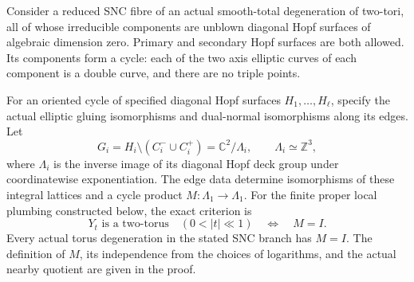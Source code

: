 \begin{proposition}\label{cdp:st:C.2.UN.46}

Consider a reduced SNC fibre of an actual smooth-total
degeneration of two-tori, all of whose irreducible components
are unblown diagonal Hopf surfaces of algebraic dimension zero.
Primary and secondary Hopf surfaces are both allowed.
Its components form a cycle: each of the two axis elliptic
curves of each component is a double curve, and there are
no triple points.

For an oriented cycle of specified diagonal Hopf surfaces
$H_1,\ldots,H_\ell$, specify the actual elliptic gluing
isomorphisms and dual-normal isomorphisms along its edges.
Let
\[
 G_i=H_i\setminus(C_i^-\cup C_i^+)
       =\mathbb C^2/\Lambda_i,\qquad \Lambda_i\simeq\mathbb Z^3,
\tag{C.HC.1}\label{cdp:eq:C.HC.1}
\]
where $\Lambda_i$ is the inverse image of its diagonal
Hopf deck group under coordinatewise exponentiation.
The edge data determine isomorphisms of these integral
lattices and a cycle product $M:\Lambda_1\to\Lambda_1$.
For the finite proper local plumbing constructed below,
the exact criterion is
\[
 \text{$Y_t$ is a two-torus}\quad(0<|t|\ll1)
       \quad\Longleftrightarrow\quad M=I.
\tag{C.HC.2}\label{cdp:eq:C.HC.2}
\]
Every actual torus degeneration in the stated SNC branch
has $M=I$. The definition of $M$, its independence from
the choices of logarithms, and the actual nearby quotient
are given in the proof.


\end{proposition}
